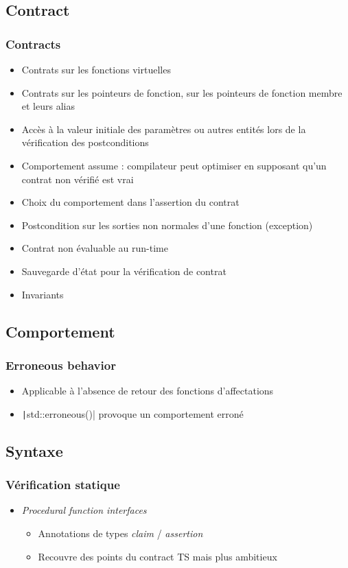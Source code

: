 \documentclass[C++.tex]{subfiles}
\begin{document}
\subsection*{Contract}
\begin{frame}[fragile]
	\frametitle{Contracts}
	\begin{itemize}
		\item Contrats sur les fonctions virtuelles
		\item Contrats sur les pointeurs de fonction, sur les pointeurs de fonction membre et leurs alias
		\item Accès à la valeur initiale des paramètres ou autres entités lors de la vérification des postconditions
		\item Comportement \og{}assume\fg{} : compilateur peut optimiser en supposant qu'un contrat non vérifié est vrai
		\item Choix du comportement dans l'assertion du contrat
		\item Postcondition sur les sorties non normales d'une fonction (exception)
		\item Contrat non évaluable au run-time
		\item Sauvegarde d'état pour la vérification de contrat
		\item Invariants
	\end{itemize}
\end{frame}

\subsection*{Comportement}
\begin{frame}[fragile]
	\frametitle{Erroneous behavior}
	\begin{itemize}
		\item Applicable à l'absence de retour des fonctions d'affectations
		\item \texttt|std::erroneous()| provoque un comportement erroné
	\end{itemize}

\end{frame}

\subsection*{Syntaxe}
\begin{frame}[fragile]
	\frametitle{Vérification statique}
	\begin{itemize}
		\item \textit{Procedural function interfaces}
		\begin{itemize}
			\item Annotations de types \textit{claim} / \textit{assertion}
			\item Recouvre des points du contract TS mais plus ambitieux
		\end{itemize}
	\end{itemize}
\end{frame}
\end{document}
